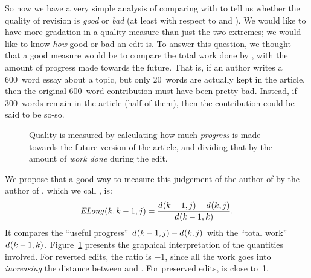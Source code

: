 So now we have a very simple analysis of comparing
 with  to tell us whether the
quality of revision  is \textit{good} or \textit{bad}
(at least with respect to  and ).
We would like to have more gradation in a quality measure than
just the two extremes; we would like to know \textit{how} good
or bad an edit is.
To answer this question, we thought that a good measure would
be to compare the total work done by ,
with the amount of progress made towards the future.
That is, if an author writes a 600~word essay about a topic,
but only 20~words are actually kept in the article, then the
original 600~word contribution must have been pretty bad.
Instead, if 300~words remain in the article (half of them),
then the contribution could be said to be so-so.

\begin{figure}
\centering
{}
\caption[Quality is progress towards the future, divided by the work done]{
        Quality is measured by calculating how much \textit{progress}
	is made towards the future version of the article,
	and dividing that by the amount of \textit{work done}
	during the edit.}
\label{fig-editlong}
\end{figure}

We propose that a good way to measure this judgement
of the author of 
by the author of ,
which we call , is:
\begin{equation}
\esurv{}{k,k-1,j} = \frac{\dist{}{k-1,j} - \dist{}{k,j}}
                        {\dist{}{k-1,k}},
\label{eq:esurv}
\end{equation}
It compares the ``useful progress''
$d_{}(k-1,j) - d_{}(k,j)$
with the ``total work''
$d_{}(k-1,k)$.
Figure~\ref{fig-editlong} presents the graphical interpretation
of the quantities involved.
  For reverted edits, the ratio 
  is $-1$, since all the work
  goes into \textit{increasing} the distance between  and .
  For preserved edits,  is close to~1.

